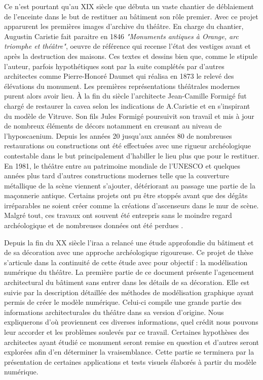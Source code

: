 			 Ce n'est pourtant qu'au XIX siècle que débuta un vaste chantier de déblaiement de l'enceinte dans le but de restituer au bâtiment son rôle premier. Avec ce projet apparurent les premières images d'archive du théâtre. En charge du chantier, Augustin Caristie fait paraitre en 1846 \textit{"Monuments antiques à Orange, arc triomphe et théâtre"}, oeuvre de référence qui recense l'état des vestiges avant et après la destruction des maisons. Ces textes et dessins bien que, comme le stipule l'auteur, parfois hypothétiques sont par la suite complétés par d'autres architectes comme Pierre-Honoré Daumet qui réalisa en 1873 le relevé des élévations du monument. Les premières représentations théâtrales modernes purent alors avoir lieu. \`{A} la fin du siècle l'architecte Jean-Camille Formigé fut chargé de restaurer la \gls{cavea} selon les indications de A.Caristie et en s'inspirant du modèle de Vitruve. Son fils Jules Formigé poursuivit son travail et mis à jour de nombreux éléments de décors notamment en creusant au niveau de l'\gls{hyposcaenium}. Depuis les années 20 jusqu'aux années 80 de nombreuses restaurations ou constructions ont été effectuées avec une rigueur archéologique contestable dans le but principalement d'habiller le lieu plus que pour le restituer. En 1981, le théâtre entre au patrimoine mondiale de l'UNESCO et quelques années plus tard d'autres constructions modernes telle que la couverture métallique de la scène viennent s'ajouter, détériorant au passage une partie de la maçonnerie antique. Certains projets ont pu être stoppés avant que des dégâts irréparables ne soient créer comme la créations d'ascenseurs dans le mur de scène. Malgré tout, ces travaux ont souvent été entrepris sans le moindre regard archéologique et de nombreuses données ont été perdues \cite[p 231- 236]{carteArcheo}.

			 
			 Depuis la fin du XX siècle l'\gls{iraa} a relancé une étude approfondie du bâtiment et de sa décoration avec une approche archéologique rigoureuse. Ce projet de thèse s'articule dans la continuité de cette étude avec pour objectif : la modélisation numérique du théâtre. La première partie de ce document présente l'agencement architectural du bâtiment sans entrer dans les détails de sa décoration. Elle est suivie par la description détaillée des méthodes de modélisation graphique ayant permis de créer le modèle numérique. Celui-ci compile une grande partie des informations architecturales du théâtre dans sa version d'origine. Nous expliquerons d'où proviennent ces diverses informations, quel crédit nous pouvons leur accorder et les problèmes soulevés par ce travail. Certaines hypothèses des architectes ayant étudié ce monument seront remise en question et d'autres seront explorées afin d'en déterminer la vraisemblance. Cette partie se terminera par la présentation de certaines applications et tests visuels élaborés à partir du modèle numérique.
			 
